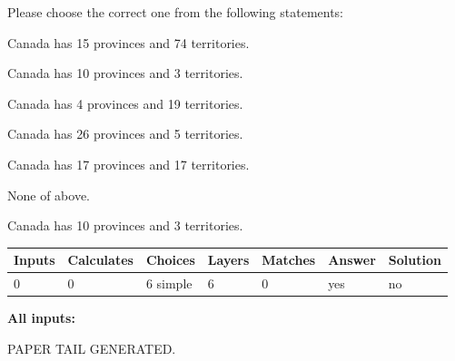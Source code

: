 \documentclass[12pt]{article}
\begin{document}
  
Please choose the correct one from the following statements:
 
 
Canada has  15 provinces and  74 territories.
 
 
Canada has 10  provinces and 3 territories.
 
 
Canada has   4 provinces and  19 territories.
 
 
Canada has  26 provinces and  5 territories.
 
 
Canada has  17 provinces and  17 territories.
 
 
 None of above.
 
 
\noindent{}
 
 
Canada has 10  provinces and 3 territories.
 
 
\noindent{}
 
 
   
   
   
   
\noindent\begin{tabular}{|l|l|l|l|l|l|l|}
 \hline
Inputs & Calculates & Choices & Layers & Matches & Answer & Solution \\ \hline
 0  & 
 0  & 
 6
  simple  
  & 
 6  & 
 0  & 
  yes & 
  no 
  \\ \hline
 \end{tabular}
   
   
   
   
\noindent{}
   
   
   
   
\noindent\vspace{0.1in}\hspace{-0.08in} {\textbf{\Large{All inputs: }}}
   
   
   
   
   
   
 \vspace{0.2in}
 
   
   
\vspace{2.0in} PAPER TAIL GENERATED.
   
   
   
\end{document}
